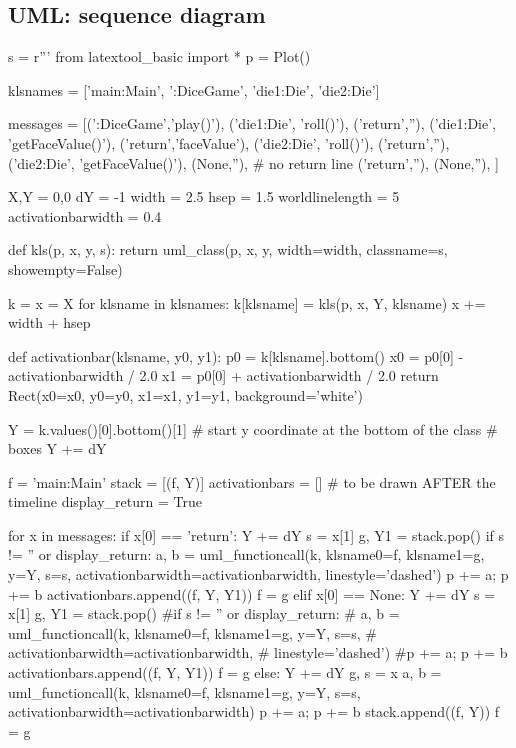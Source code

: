 \subsection{UML: sequence diagram}

\begin{python}
s = r'''
from latextool_basic import *
p = Plot()

klsnames = ['main:Main', ':DiceGame', 'die1:Die', 'die2:Die']

messages = [(':DiceGame','play()'),
            ('die1:Die', 'roll()'),
            ('return',''),
            ('die1:Die', 'getFaceValue()'),
            ('return','faceValue'),
            ('die2:Die', 'roll()'),
            ('return',''),
            ('die2:Die', 'getFaceValue()'),
            (None,''), # no return line
            ('return',''),
            (None,''), 
           ]

X,Y = 0,0
dY = -1
width = 2.5
hsep = 1.5
worldlinelength = 5
activationbarwidth = 0.4

def kls(p, x, y, s):
    return uml_class(p, x, y, width=width, classname=s, showempty=False)

k = {}
x = X
for klsname in klsnames:
    k[klsname] = kls(p, x, Y, klsname)
    x += width + hsep
    
def activationbar(klsname, y0, y1):
    p0 = k[klsname].bottom()
    x0 = p0[0] - activationbarwidth / 2.0
    x1 = p0[0] + activationbarwidth / 2.0 
    return Rect(x0=x0, y0=y0, x1=x1, y1=y1, background='white')

Y = k.values()[0].bottom()[1] # start y coordinate at the bottom of the class
                              # boxes
Y += dY

f = 'main:Main'
stack = [(f, Y)]
activationbars = [] # to be drawn AFTER the timeline
display_return = True

for x in messages:
    if x[0] == 'return':
        Y += dY
        s = x[1]
        g, Y1 = stack.pop()
        if s != '' or display_return:
            a, b = uml_functioncall(k, klsname0=f, klsname1=g, y=Y, s=s,
                   activationbarwidth=activationbarwidth,
                   linestyle='dashed')
        p += a; p += b
        activationbars.append((f, Y, Y1))
        f = g
    elif x[0] == None:
        Y += dY
        s = x[1]
        g, Y1 = stack.pop()
        #if s != '' or display_return:
        #    a, b = uml_functioncall(k, klsname0=f, klsname1=g, y=Y, s=s,
        #           activationbarwidth=activationbarwidth,
        #           linestyle='dashed')
        #p += a; p += b
        activationbars.append((f, Y, Y1))
        f = g
    else:
        Y += dY
        g, s = x
        a, b = uml_functioncall(k, klsname0=f, klsname1=g, y=Y, s=s,
               activationbarwidth=activationbarwidth)
        p += a; p += b
        stack.append((f, Y))
        f = g


\end{python}
